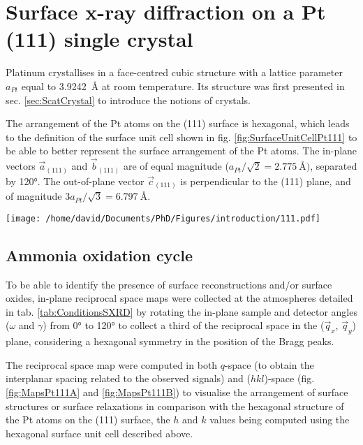\section{Surface x-ray diffraction on a Pt (111) single crystal} \label{sec:SXRD111}

Platinum crystallises in a face-centred cubic structure with a lattice parameter $a_{Pt}$ equal to \qty{3.9242}{\angstrom} at room temperature.
Its structure was first presented in sec. \ref{sec:ScatCrystal} to introduce the notions of crystals.

The arrangement of the Pt atoms on the (111) surface is hexagonal, which leads to the definition of the surface unit cell shown in fig. \ref{fig:SurfaceUnitCellPt111} to be able to better represent the surface arrangement of the Pt atoms.
The in-plane vectors $\vec{a}_{(111)}$ and $\vec{b}_{(111)}$ are of equal magnitude ($a_{Pt} / \sqrt{2} = \qty{2.775}{\angstrom})$, separated by \ang{120}.
The out-of-plane vector $\vec{c}_{(111)}$ is perpendicular to the (111) plane, and of magnitude $3 a_{Pt} / \sqrt{3} = \qty{6.797}{\angstrom}$.

\begin{SCfigure}
    \centering
    \texttt{[image: /home/david/Documents/PhD/Figures/introduction/111.pdf]}
    \caption{
        Face-centred cubic unit cell of Pt with (111) crystallographic plane drawn in green.
        $\vec{a}_{(111)}$, $\vec{b}_{(111)}$ and $\vec{c}_{(111)}$ are the $(111)$ surface unit cell vectors.
        There are three (111) planes spanned by the magnitude of $\vec{c}_{(111)}$ (blue, red and green on the figure).
    }
    \label{fig:SurfaceUnitCellPt111}
\end{SCfigure}

\subsection{Ammonia oxidation cycle}

To be able to identify the presence of surface reconstructions and/or surface oxides, in-plane reciprocal space maps were collected at the atmospheres detailed in tab. \ref{tab:ConditionsSXRD} by rotating the in-plane sample and detector angles ($\omega$ and $\gamma$) from \ang{0} to \ang{120} to collect a third of the reciprocal space in the ($\vec{q}_x$, $\vec{q}_y$) plane, considering a hexagonal symmetry in the position of the Bragg peaks.

The reciprocal space map were computed in both $q$-space (to obtain the interplanar spacing related to the observed signals) and ($hkl$)-space (fig. \ref{fig:MapsPt111A} and \ref{fig:MapsPt111B}) to visualise the arrangement of surface structures or surface relaxations in comparison with the hexagonal structure of the Pt atoms on the (111) surface, the $h$ and $k$ values being computed using the hexagonal surface unit cell described above.

